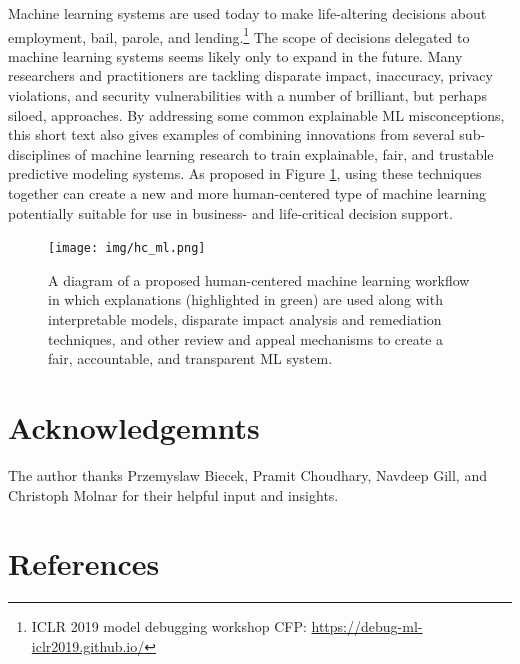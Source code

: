 \documentclass[fleqn]{article}
\begin{document}
Machine learning systems are used today to make life-altering decisions about employment, bail, parole, and lending.\footnote{ICLR 2019 model debugging workshop CFP: \url{https://debug-ml-iclr2019.github.io/}} The scope of decisions delegated to machine learning systems seems likely only to expand in the future. Many researchers and practitioners are tackling disparate impact, inaccuracy, privacy violations, and security vulnerabilities with a number of brilliant, but perhaps siloed, approaches. By addressing some common explainable ML misconceptions, this short text also gives examples of combining innovations from several sub-disciplines of machine learning research to train explainable, fair, and trustable predictive modeling systems. As proposed in Figure \ref{fig:hc_ml}, using these techniques together can create a new and more human-centered type of machine learning potentially suitable for use in business- and life-critical decision support.\\

\vspace{100pt}

\begin{figure}[htb!]
	\begin{center}
		\texttt{[image: img/hc\_ml.png]}
		\caption{A diagram of a proposed human-centered machine learning workflow in which explanations (highlighted in green) are used along with interpretable models, disparate impact analysis and remediation techniques, and other review and appeal mechanisms to create a fair, accountable, and transparent ML system.}
		\label{fig:hc_ml}
	\end{center}
\end{figure}

\section*{Acknowledgemnts}

The author thanks Przemyslaw Biecek, Pramit Choudhary, Navdeep Gill, and Christoph Molnar for their helpful input and insights. 

\section*{References}
\small


\end{document}
